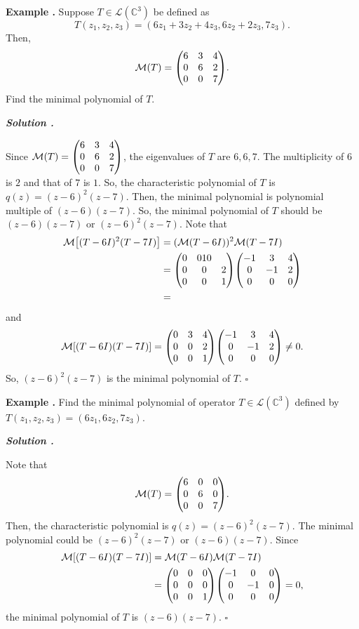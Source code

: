\documentclass[11pt, letterpaper]{article}
\newcounter{index}[subsection]
\newenvironment*{eg}{\begin{framed}\par\noindent\textbf{Example \thesubsection.\stepcounter{index}\theindex}}{\par\end{framed}}
\newcounter{nprf}[subsection]
\newenvironment*{sol}{\par\indent\textbf{\textit{Solution \stepcounter{nprf}\thenprf.}}\par}{\hfill{$\square$}\par}
\def\C{\mathbb{C}}
\def\L{\mathcal{L}}
\def\M{\mathcal{M}}
\begin{document}
\begin{eg}
	Suppose $T\in\L(\C^3)$ be defined as \[T(z_1,z_2,z_3)=(6z_1+3z_2+4z_3,6z_2+2z_3,7z_3).\]	 Then, \[\M(T)=\mqty(6&3&4\\0&6&2\\0&0&7).\] Find the minimal polynomial of $T$. 
	\begin{sol}
		Since $\M(T)=\mqty(6&3&4\\0&6&2\\0&0&7)$, the eigenvalues of $T$ are $6, 6, 7$. The multiplicity of $6$ is $2$ and that of $7$ is $1$. So, the characteristic polynomial of $T$ is $q(z)=(z-6)^2(z-7)$. Then, the minimal polynomial is polynomial multiple of $(z-6)(z-7)$. So, the minimal polynomial of $T$ should be $(z-6)(z-7)$ or $(z-6)^2(z-7)$. Note that \[\begin{aligned}\M\qty[(T-6I)^2(T-7I)]&=(\M(T-6I))^2\M(T-7I)\\&=\mqty(0&010\\0&0&2\\0&0&1)\mqty(-1&3&4\\0&-1&2\\0&0&0)\\&=\end{aligned}\] and \[\M\qty[(T-6I)(T-7I)]=\mqty(0&3&4\\0&0&2\\0&0&1)\mqty(-1&3&4\\0&-1&2\\0&0&0)\neq0.\] So, $(z-6)^2(z-7)$ is the minimal polynomial of $T$. 
	\end{sol}
\end{eg}
\begin{eg}
	Find the minimal polynomial of operator $T\in\L(\C^3)$ defined by $T(z_1,z_2,z_3)=(6z_1,6z_2,7z_3)$.
	\begin{sol}
		Note that \[\M(T)=\mqty(6&0&0\\0&6&0\\0&0&7).\] Then, the characteristic polynomial is $q(z)=(z-6)^2(z-7)$. The minimal polynomial could be $(z-6)^2(z-7)$ or $(z-6)(z-7)$. Since \[\begin{aligned}\M[(T-6I)(T-7I)]&=\M(T-6I)\M(T-7I)\\&=\mqty(0&0&0\\0&0&0\\0&0&1)\mqty(-1&0&0\\0&-1&0\\0&0&0)=0,\end{aligned}\] the minimal polynomial of $T$ is $(z-6)(z-7)$.
	\end{sol}
\end{eg}
\end{document}
